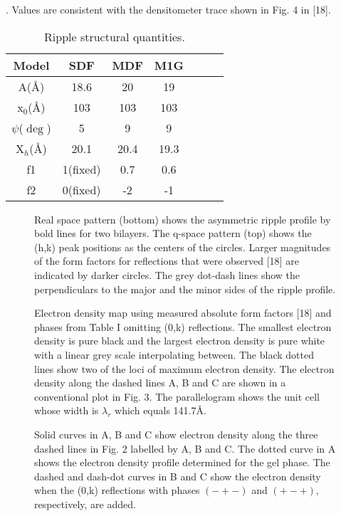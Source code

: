 \begin{table}
{. Values are consistent with the densitometer trace shown in 
	Fig. 4 in [18].
}
\end{table}

\begin{table}
\caption{Ripple structural quantities.
\label{parameter}}
\vspace{6pt}
\begin{tabular}{ccccccc} 
Model & SDF & MDF & M1G \\ \hline
A(\AA) & 18.6 & 20  & 19 \\
x$_0$(\AA) & 103 & 103 & 103 \\
$\psi$($\deg$) & 5 & 9 & 9 \\
X$_h$(\AA) & 20.1 & 20.4 & 19.3 \\
f1 & 1(fixed) & 0.7 & 0.6 \\
f2 & 0(fixed) & -2 & -1 \\
\end{tabular}
\end{table}

\begin{figure}
\centerline {}
\vspace{11pt}
\caption{Real space pattern (bottom) shows the asymmetric ripple profile by 
bold lines for two bilayers.  The q-space pattern (top) shows the (h,k) 
peak positions as the centers of the circles.  Larger magnitudes of the 
form factors for reflections that were observed [18] are indicated 
by darker circles.  The grey dot-dash lines show the perpendiculars to the 
major and the minor sides of the ripple profile.
\label{Fig1}}
\end{figure}

\begin{figure}
\centerline {}
\vspace{11pt}
\caption{Electron density map using measured absolute form factors 
[18] and phases from Table I omitting (0,k) reflections.  The smallest 
electron density is pure black and the largest electron density is pure 
white with a linear grey scale interpolating between.  The black dotted 
lines show two of the loci of maximum electron density. The electron 
density along the dashed lines A, B and C are shown in a conventional plot 
in Fig. 3.  The parallelogram shows the unit cell whose width is $\lambda_r$ 
which equals 141.7\AA.
\label{Fig2}}
\end{figure}

\begin{figure}
\centerline {}
\vspace{11pt}
\caption{Solid curves in A, B and C show electron density along the three 
dashed lines in Fig. 2 labelled by A, B and C.  The dotted curve in
A shows the electron density profile determined for the gel phase.
The dashed and dash-dot curves in B and C show the electron density when
the (0,k) reflections with phases $(-+-)$ and $(+-+)$, respectively, are
added.
\label{Fig3}}
\end{figure}
